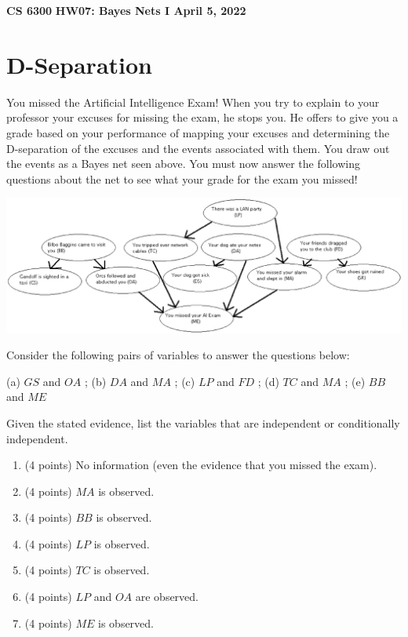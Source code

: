 \documentclass[12pt]{article}
\begin{document}
\begin{center}
{\bf CS 6300} \hfill {\large\bf HW07: Bayes Nets I \hfill April 5, 2022}
\end{center}

\section{D-Separation}

You missed the Artificial Intelligence Exam! When you try to explain to your professor your excuses for 
missing the exam, he stops you.  He offers to give you a grade based on your performance of mapping
your excuses and determining the D-separation of the excuses and the events associated with them. 
You draw out the events as a Bayes net seen above.  You must now answer the following questions
about the net to see what your grade for the exam you missed!

\begin{center}
\includegraphics[width=1.0\textwidth]{excuses.eps}
\end{center}

\noindent 
Consider the following pairs of variables to answer the questions below:
\newline\newline
\centerline{(a) $GS$ and $OA$  ;  (b) $DA$ and $MA$  ;  (c) $LP$ and $FD$  ;  (d) $TC$ and $MA$  ;  (e) $BB$ and $ME$}

Given the stated evidence, list the variables that are independent or conditionally independent.

\begin{enumerate}

	\item (4 points) No information (even the evidence that you missed the exam).

	\item (4 points) $MA$ is observed.

	\item (4 points) $BB$ is observed.

	\item (4 points) $LP$ is observed.

	\item (4 points) $TC$ is observed.

	\item (4 points) $LP$  and $OA$ are observed.

	\item (4 points) $ME$ is observed.

\end{enumerate}
\end{document}

